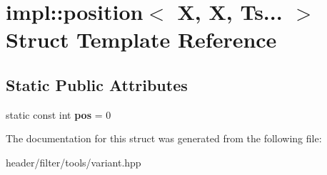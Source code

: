 \hypertarget{structimpl_1_1position_3_01_x_00_01_x_00_01_ts_8_8_8_01_4}{}\section{impl\+:\+:position$<$ X, X, Ts... $>$ Struct Template Reference}
\label{structimpl_1_1position_3_01_x_00_01_x_00_01_ts_8_8_8_01_4}
\subsection*{Static Public Attributes}
\begin{DoxyCompactItemize}
\item 
\mbox{\label{structimpl_1_1position_3_01_x_00_01_x_00_01_ts_8_8_8_01_4_a149977d97ec8693f248011eb87fbfcfa}} 
static const int {\bfseries pos} = 0
\end{DoxyCompactItemize}


The documentation for this struct was generated from the following file\+:\begin{DoxyCompactItemize}
\item 
header/filter/tools/variant.\+hpp\end{DoxyCompactItemize}
